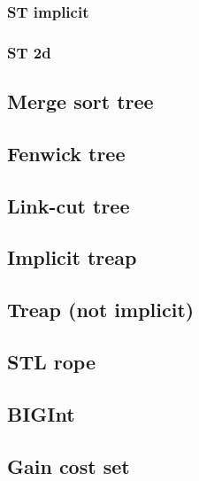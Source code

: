 \subsubsection{ST implicit}

\subsubsection{ST 2d}


\newpage
\subsection{Merge sort tree}


\subsection{Fenwick tree}


\subsection{Link-cut tree}


\subsection{Implicit treap}


\subsection{Treap (not implicit)}

\newpage
\subsection{STL rope}

\subsection{BIGInt}

\subsection{Gain cost set}

%
